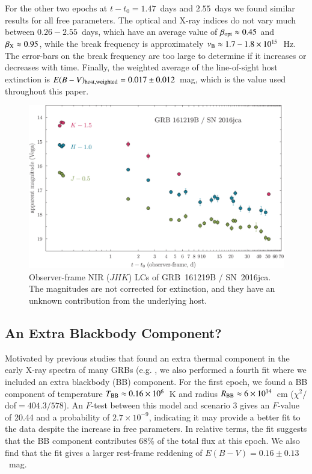 \documentclass[traditabstract,longauth]{aa}
\begin{document}
For the other two epochs at $t -t_0 = 1.47$~days and $2.55$~days we found similar results for all free parameters.  The optical and X-ray indices do not vary much between $0.26-2.55$~days, which have an average value of $\beta_{\rm opt} \approx 0.45$ and $\beta_{\rm X} \approx 0.95$, while the break frequency is approximately $\nu_{\rm B} \approx 1.7-1.8\times10^{15}$~Hz.  The error-bars on the break frequency are too large to determine if it increases or decreases with time.  Finally, the weighted average of the line-of-sight host extinction is $E(B-V)_{\rm host, weighted} = 0.017\pm0.012$~mag, which is the value used throughout this paper.


\begin{figure}
   \includegraphics[width=\columnwidth]{Fig7_GRB161219B_LC_IR-eps-converted-to.pdf}
      \caption{Observer-frame NIR ($JHK$) LCs of GRB~161219B / SN~2016jca.  The magnitudes are not corrected for extinction, and they have an unknown contribution from the underlying host. }
         \label{FigLC_IR}
\end{figure}

\subsection{An Extra Blackbody Component?}


Motivated by previous studies that found an extra thermal component in the early X-ray spectra of many GRBs (e.g. \citealt{Campana06,Starling11,Page11,Thoene11,SparStar12,FriisWatson13,Schulze14}, we also performed a fourth fit where we included an extra blackbody (BB) component.  For the first epoch, we found a BB component of temperature $T_{\rm BB} \approx 0.16\times10^6$~K and radius $R_{\rm BB} \approx 6\times10^{14}$~cm ($\chi^2/$dof$ = 404.3/578$).  An $F$-test between this model and scenario 3 gives an $F$-value of 20.44 and a probability of $2.7\times10^{-9}$, indicating it may provide a better fit to the data despite the increase in free parameters.  In relative terms, the fit suggests that the BB component contributes 68\% of the total flux at this epoch.  We also find that the fit gives a larger rest-frame reddening of $E(B-V)=0.16\pm0.13$~mag.
\end{document}
